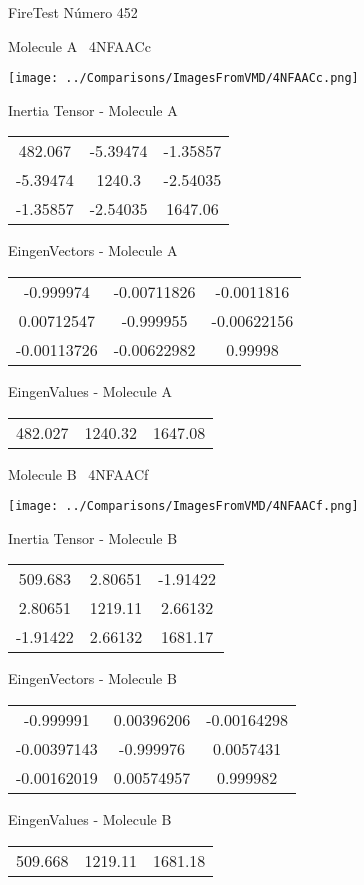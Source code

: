 \vtab[-3cm]
\begin{center}
{\large FireTest \tab Número 452}
\end{center}
\begin{multicols}{2}
\begin{center}

Molecule A \
4NFAACc

\texttt{[image: ../Comparisons/ImagesFromVMD/4NFAACc.png]}

Inertia Tensor - Molecule A \\
\begin{tabular}{|c c c|}
482.067	 & 	-5.39474	 & 	-1.35857	 \\
-5.39474	 & 	1240.3	 & 	-2.54035	 \\
-1.35857	 & 	-2.54035	 & 	1647.06
\end{tabular}

\vtab
 EingenVectors - Molecule A     \\
\begin{tabular}{|c c c|}
-0.999974	 & 	-0.00711826	 & 	-0.0011816	 \\
0.00712547	 & 	-0.999955	 & 	-0.00622156	 \\
-0.00113726	 & 	-0.00622982	 & 	0.99998
\end{tabular}

\vtab
 EingenValues - Molecule A     \\
\begin{tabular}{|c c c|}
482.027	 & 	1240.32	 & 	1647.08	 \\
\end{tabular}
\columnbreak

Molecule B \
4NFAACf

\texttt{[image: ../Comparisons/ImagesFromVMD/4NFAACf.png]}

Inertia Tensor - Molecule B \\
\begin{tabular}{|c c c|}
509.683	 & 	2.80651	 & 	-1.91422	 \\
2.80651	 & 	1219.11	 & 	2.66132	 \\
-1.91422	 & 	2.66132	 & 	1681.17
\end{tabular}

\vtab
 EingenVectors - Molecule B     \\
\begin{tabular}{|c c c|}
-0.999991	 & 	0.00396206	 & 	-0.00164298	 \\
-0.00397143	 & 	-0.999976	 & 	0.0057431	 \\
-0.00162019	 & 	0.00574957	 & 	0.999982
\end{tabular}

\vtab
 EingenValues - Molecule B     \\
\begin{tabular}{|c c c|}
509.668	 & 	1219.11	 & 	1681.18	 \\
\end{tabular}

\end{center}
\end{multicols}

